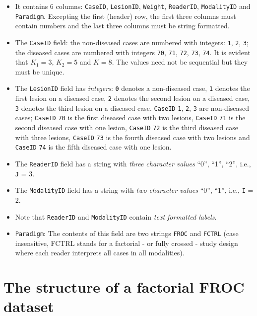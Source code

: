 \documentclass[
]{book}
\providecommand{\tightlist}{%
  \setlength{\itemsep}{0pt}\setlength{\parskip}{0pt}}
\begin{document}
\begin{itemize}
\tightlist
\item
  It contains 6 columns: \texttt{CaseID}, \texttt{LesionID}, \texttt{Weight}, \texttt{ReaderID}, \texttt{ModalityID} and \texttt{Paradigm}. Excepting the first (header) row, the first three columns must contain numbers and the last three columns must be string formatted.
\item
  The \texttt{CaseID} field: the non-diseased cases are numbered with integers: \texttt{1}, \texttt{2}, \texttt{3}; the diseased cases are numbered with integers \texttt{70}, \texttt{71}, \texttt{72}, \texttt{73}, \texttt{74}. It is evident that \(K_1 = 3\), \(K_2 = 5\) and \(K = 8\). The values need not be sequential but they must be unique.
\item
  The \texttt{LesionID} field has \emph{integers}: \texttt{0} denotes a non-diseased case, \texttt{1} denotes the first lesion on a diseased case, \texttt{2} denotes the second lesion on a diseased case, \texttt{3} denotes the third lesion on a diseased case. \texttt{CaseID} \texttt{1}, \texttt{2}, \texttt{3} are non-diseased cases; \texttt{CaseID} \texttt{70} is the first diseased case with two lesions, \texttt{CaseID} \texttt{71} is the second diseased case with one lesion, \texttt{CaseID} \texttt{72} is the third diseased case with three lesions, \texttt{CaseID} \texttt{73} is the fourth diseased case with two lesions and \texttt{CaseID} \texttt{74} is the fifth diseased case with one lesion.
\item
  The \texttt{ReaderID} field has a string with \emph{three character values} ``0'', ``1'', ``2'', i.e., \texttt{J} = 3.
\item
  The \texttt{ModalityID} field has a string with \emph{two character values} ``0'', ``1'', i.e., \texttt{I} = 2.
\item
  Note that \texttt{ReaderID} and \texttt{ModalityID} contain \emph{text formatted labels}.
\item
  \texttt{Paradigm}: The contents of this field are two strings \texttt{FROC} and \texttt{FCTRL} (case insensitive, FCTRL stands for a factorial - or fully crossed - study design where each reader interprets all cases in all modalities).
\end{itemize}

\hypertarget{the-structure-of-a-factorial-froc-dataset}{%
\section{The structure of a factorial FROC dataset}\label{the-structure-of-a-factorial-froc-dataset}}
\end{document}
